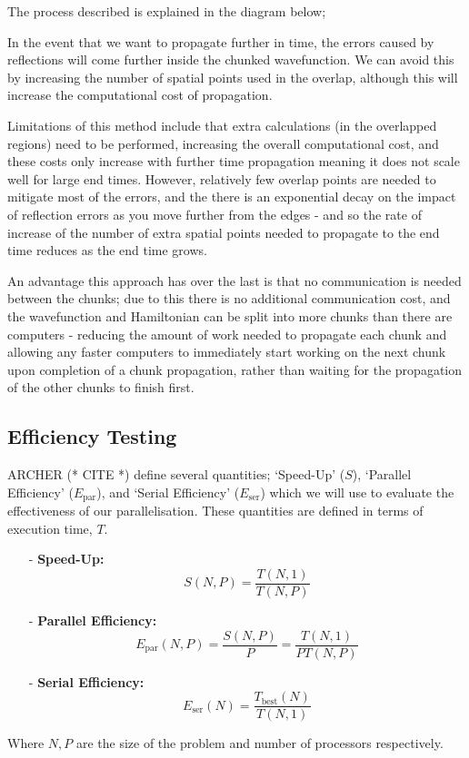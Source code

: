 The process described is explained in the diagram below;



In the event that we want to propagate further in time, the errors caused by reflections will come further inside the chunked wavefunction. We can avoid this by increasing the number of spatial points used in the overlap, although this will increase the computational cost of propagation. 

Limitations of this method include that extra calculations (in the overlapped regions) need to be performed, increasing the overall computational cost, and these costs only increase with further time propagation meaning it does not scale well for large end times. However, relatively few overlap points are needed to mitigate most of the errors, and the there is an exponential decay on the impact of reflection errors as you move further from the edges - and so the rate of increase of the number of extra spatial points needed to propagate to the end time reduces as the end time grows. 

An advantage this approach has over the last is that no communication is needed between the chunks; due to this there is no additional communication cost, and the wavefunction and Hamiltonian can be split into more chunks than there are computers - reducing the amount of work needed to propagate each chunk and allowing any faster computers to immediately start working on the next chunk upon completion of a chunk propagation, rather than waiting for the propagation of the other chunks to finish first.

\subsection{Efficiency Testing}
ARCHER (* CITE *) define several quantities; `Speed-Up' ($S$), `Parallel Efficiency' ($E_{\text{par}}$), and `Serial Efficiency' ($E_{\text{ser}}$) which we will use to evaluate the effectiveness of our parallelisation. These quantities are defined in terms of execution time, $T$.
\begin{itemize}
	\item[-]{\textbf{Speed-Up: }
		$$
		S\left(N,P\right) = \frac{T\left(N,1\right)}{T\left(N,P\right)}
		$$}

	\item[-]{\textbf{Parallel Efficiency: }
		$$
		E_{\text{par}}\left(N,P\right) = \frac{S\left(N,P\right)}{P} = \frac{T\left(N,1\right)}{PT\left(N,P\right)}
		$$}

	\item[-]{\textbf{Serial Efficiency: }
		$$
		E_{\text{ser}}\left(N\right) = \frac{T_{\text{best}}\left(N\right)}{T\left(N,1\right)}
		$$}
\end{itemize}
Where $N, P$ are the size of the problem and number of processors respectively.




